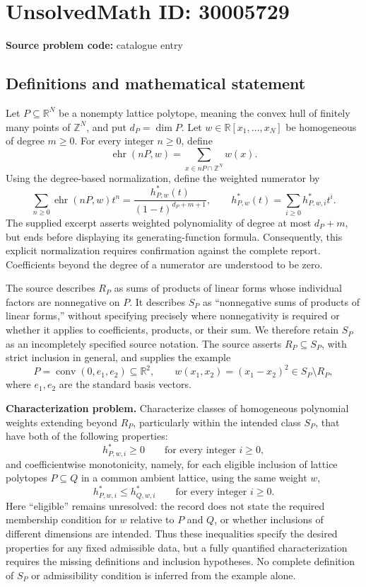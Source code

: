 \documentclass[11pt]{article}
\newcommand{\Z}{\mathbb{Z}}
\newcommand{\R}{\mathbb{R}}
\begin{document}
\section*{UnsolvedMath ID: 30005729}
\textbf{Source problem code:} catalogue entry
\subsection{Definitions and mathematical statement}
Let \(P\subseteq\R^N\) be a nonempty lattice polytope, meaning the convex hull of finitely many points of \(\Z^N\), and put \(d_P=\dim P\). Let \(w\in\R[x_1,\ldots,x_N]\) be homogeneous of degree \(m\geq0\). For every integer \(n\geq0\), define
\[
\operatorname{ehr}(nP,w)=\sum_{x\in nP\cap\Z^N}w(x).
\]
Using the degree-based normalization, define the weighted numerator by
\[
\sum_{n\geq0}\operatorname{ehr}(nP,w)t^n
=\frac{h^*_{P,w}(t)}{(1-t)^{d_P+m+1}},
\qquad
h^*_{P,w}(t)=\sum_{i\geq0}h^*_{P,w,i}t^i.
\]
The supplied excerpt asserts weighted polynomiality of degree at most \(d_P+m\), but ends before displaying its generating-function formula. Consequently, this explicit normalization requires confirmation against the complete report. Coefficients beyond the degree of a numerator are understood to be zero.

The source describes \(R_P\) as sums of products of linear forms whose individual factors are nonnegative on \(P\). It describes \(S_P\) as ``nonnegative sums of products of linear forms,'' without specifying precisely where nonnegativity is required or whether it applies to coefficients, products, or their sum. We therefore retain \(S_P\) as an incompletely specified source notation. The source asserts \(R_P\subseteq S_P\), with strict inclusion in general, and supplies the example
\[
P=\operatorname{conv}(0,e_1,e_2)\subseteq\R^2,
\qquad w(x_1,x_2)=(x_1-x_2)^2\in S_P\setminus R_P,
\]
where \(e_1,e_2\) are the standard basis vectors.

\textbf{Characterization problem.} Characterize classes of homogeneous polynomial weights extending beyond \(R_P\), particularly within the intended class \(S_P\), that have both of the following properties:
\[
 h^*_{P,w,i}\geq0\qquad\text{for every integer }i\geq0,
\]
and coefficientwise monotonicity, namely, for each eligible inclusion of lattice polytopes \(P\subseteq Q\) in a common ambient lattice, using the same weight \(w\),
\[
 h^*_{P,w,i}\leq h^*_{Q,w,i}
 \qquad\text{for every integer }i\geq0.
\]
Here ``eligible'' remains unresolved: the record does not state the required membership condition for \(w\) relative to \(P\) and \(Q\), or whether inclusions of different dimensions are intended. Thus these inequalities specify the desired properties for any fixed admissible data, but a fully quantified characterization requires the missing definitions and inclusion hypotheses. No complete definition of \(S_P\) or admissibility condition is inferred from the example alone.
\end{document}
